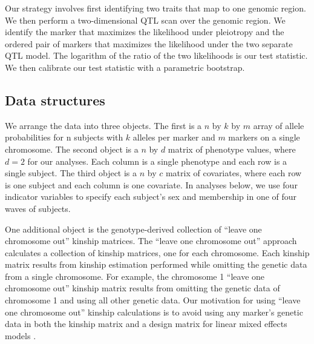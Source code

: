 \documentclass[12pt,twoside, lineno]{gsajnl}
\begin{document}
Our strategy involves first identifying two traits that map to one genomic region. We then perform a two-dimensional QTL scan over the genomic region. We identify the marker that maximizes the likelihood under pleiotropy and the ordered pair of markers that maximizes the likelihood under the two separate QTL model. The logarithm of the ratio of the two likelihoods is our test statistic. We then calibrate our test statistic with a parametric bootstrap. 

\subsection{Data structures}

We arrange the data into three objects. The first is a $n$ by $k$ by $m$ array of allele probabilities for n subjects with $k$ alleles per marker and $m$ markers on a single chromosome. The second object is a $n$ by $d$ matrix of phenotype values, where $d = 2$ for our analyses. Each column is a single phenotype and each row is a single subject. The third object is a $n$ by $c$ matrix of covariates, where each row is one subject and each column is one covariate. In analyses below, we use four indicator variables to specify each subject's sex and membership in one of four waves of subjects.

One additional object is the genotype-derived collection of ``leave one chromosome out'' kinship matrices. The ``leave one chromosome out'' approach calculates a collection of kinship matrices, one for each chromosome. Each kinship matrix results from kinship estimation performed while omitting the genetic data from a single chromosome. For example, the chromosome 1 ``leave one chromosome out'' kinship matrix results from omitting the genetic data of chromosome 1 and using all other genetic data. Our motivation for using ``leave one chromosome out'' kinship calculations is to avoid using any marker's genetic data in both the kinship matrix and a design matrix for linear mixed effects models \citep{yang2014advantages}. 




\end{document}
